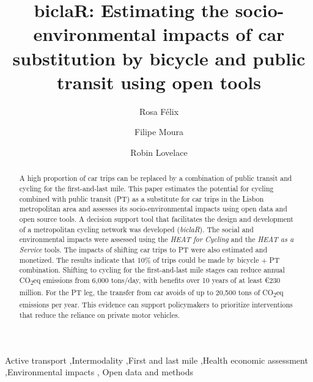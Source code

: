 \documentclass[review, doubleblind, 3p,
authoryear]{elsarticle} %
\begin{document}
\begin{frontmatter}

  \title{biclaR: Estimating the socio-environmental impacts of car
substitution by bicycle and public transit using open tools}
    \author[CERIS]{Rosa Félix%
  }
    \author[CERIS]{Filipe Moura%
  }
    \author[ITS]{Robin Lovelace%
  }
  
  \begin{abstract}
  A high proportion of car trips can be replaced by a combination of
  public transit and cycling for the first-and-last mile. This paper
  estimates the potential for cycling combined with public transit (PT)
  as a substitute for car trips in the Lisbon metropolitan area and
  assesses its socio-environmental impacts using open data and open
  source tools. A decision support tool that facilitates the design and
  development of a metropolitan cycling network was developed
  (\emph{biclaR}). The social and environmental impacts were assessed
  using the \emph{HEAT for Cycling} and the \emph{HEAT as a Service}
  tools. The impacts of shifting car trips to PT were also estimated and
  monetized. The results indicate that 10\% of trips could be made by
  bicycle + PT combination. Shifting to cycling for the first-and-last
  mile stages can reduce annual CO\textsubscript{2}eq emissions from
  6,000 tons/day, with benefits over 10 years of at least €230 million.
  For the PT leg, the transfer from car avoids of up to 20,500 tons of
  CO\textsubscript{2}eq emissions per year. This evidence can support
  policymakers to prioritize interventions that reduce the reliance on
  private motor vehicles.\\
  \end{abstract}
    \begin{keyword}
    Active transport \sep Intermodality \sep First and last
mile \sep Health economic assessment \sep Environmental impacts \sep 
    Open data and methods
  \end{keyword}
  
 \end{frontmatter}
\end{document}
